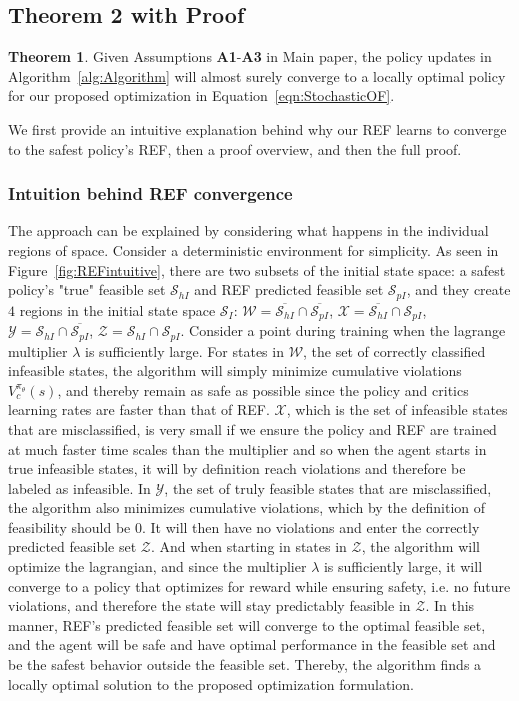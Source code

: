 \documentclass{article}
\theoremstyle{definition}
\newtheorem{theorem}{Theorem}
\begin{document}
\subsection{Theorem 2 with Proof}
\label{sec:ConvergenceThm}

\begin{theorem}
    Given Assumptions \textbf{A1}-\textbf{A3} in Main paper, the policy updates in Algorithm~\ref{alg:Algorithm} 
    will almost surely converge to a locally optimal policy for our proposed optimization in Equation~\ref{eqn:StochasticOF}.  
\end{theorem}


We first provide an intuitive explanation behind why our REF learns to converge to the safest policy's REF, then a proof overview, and then the full proof.

\subsubsection{Intuition behind REF convergence}
The approach can be explained by considering what happens in the individual regions of space. Consider a deterministic environment for simplicity. As seen in Figure~\ref{fig:REFintuitive}, there are two subsets of the initial state space: a safest policy's "true" feasible set $\mathcal{S}_{hI}$ and REF predicted feasible set $\mathcal{S}_{pI}$, and they create $4$ regions in the initial state space $\mathcal{S}_I$: 
$\mathcal{W}=\overline{\mathcal{S}_{hI}}\cap\overline{ \mathcal{S}_{pI}}$, $\mathcal{X}=\overline{\mathcal{S}_{hI}}\cap \mathcal{S}_{pI}$, $\mathcal{Y}=\mathcal{S}_{hI}\cap\overline{ \mathcal{S}_{pI}}$, $\mathcal{Z}=\mathcal{S}_{hI}\cap \mathcal{S}_{pI}$. Consider a point during training when the lagrange multiplier $\lambda$ is sufficiently large. For states in $\mathcal{W}$, the set of correctly classified infeasible states, the algorithm will simply minimize cumulative violations $V^{\pi_\theta}_c(s)$, and thereby remain as safe as possible since the policy and critics learning rates are faster than that of REF. $\mathcal{X}$, which is the set of infeasible states that are misclassified, is very small if we ensure the policy and REF are trained at much faster time scales than the multiplier and so when the agent starts in true infeasible states, it will by definition reach violations and therefore be labeled as infeasible. In $\mathcal{Y}$, the set of truly feasible states that are misclassified, the algorithm also minimizes cumulative violations, which by the definition of feasibility should be $0$. It will then have no violations and enter the correctly predicted feasible set $\mathcal{Z}$. And when starting in states in $\mathcal{Z}$, the algorithm will optimize the lagrangian, and since the multiplier $\lambda$ is sufficiently large, it will converge to a policy that optimizes for reward while ensuring safety, i.e. no future violations, and therefore the state will stay predictably feasible in $\mathcal{Z}$. In this manner, REF's predicted feasible set will converge to the optimal feasible set, and the agent will be safe and have optimal performance in the feasible set and be the safest behavior outside the feasible set. Thereby, the algorithm finds a locally optimal solution to the proposed optimization formulation.
\end{document}

